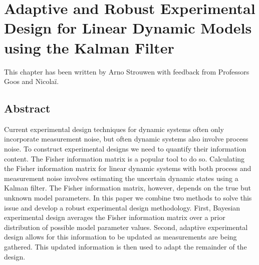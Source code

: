 \chapter{Adaptive and Robust Experimental Design for Linear Dynamic Models using the Kalman Filter}
\label{paper3}
This chapter has been written by Arno Strouwen with feedback from Professors Goos and Nicolaï.
\section*{Abstract}
Current experimental design techniques for dynamic systems often only incorporate measurement noise, but often dynamic systems also involve process noise. To construct experimental designs we need to quantify their information content. The Fisher information matrix is a popular tool to do so. Calculating the Fisher information matrix for linear dynamic systems with both process and measurement noise involves estimating the uncertain dynamic states using a Kalman filter. The Fisher information matrix, however, depends on the true but unknown model parameters. In this paper we combine two methods to solve this issue and develop a robust experimental design methodology. First, Bayesian experimental design averages the Fisher information matrix over a prior distribution of possible model parameter values. Second, adaptive experimental design allows for this information to be updated as measurements are being gathered. This updated information is then used to adapt the remainder of the design.
